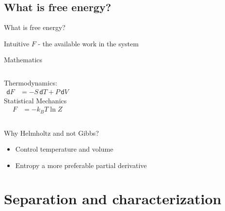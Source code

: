 \documentclass{beamer}
\newcommand*{\diff}{\mathsf{d}}
\begin{document}
\subsection*{What is free energy?}
\begin{frame}{What is free energy?}
		\begin{block}{Intuitive}
			$F$ - the available work in the system
		\end{block}
		\begin{block}{Mathematics}
		\vspace{1em}
		\begin{columns}[t]
		{\centering Thermodynamics:
		\begin{align*}
			\diff F &= - S\,  \diff T + P\, \diff V
		\end{align*}}
		{\centering
		Statistical Mechanics
		\begin{align*}
		F &= - k_B T \ln Z
		\end{align*}}
		\end{columns}
		\end{block}		
		Why Helmholtz and not Gibbs?
	\begin{itemize}
		\item Control temperature and volume 
		\item Entropy a more preferable partial derivative
	\end{itemize}
	\end{frame}

\section*{Separation and characterization}
\end{document}
